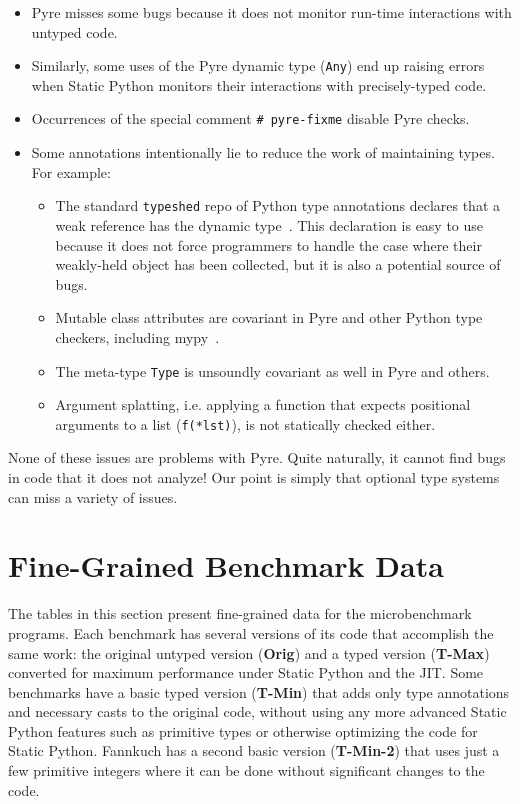 \documentclass[english,cleveref,submission]{programming}
\newcommand{\SP}{Static Python}
\newcommand{\code}[1]{\texttt{#1}}
\begin{document}
\begin{itemize}
  \item
    Pyre misses some bugs because it does not monitor run-time interactions
    with untyped code.

  \item
    Similarly, some uses of the Pyre dynamic type (\code{Any}) end up
    raising errors when \SP{} monitors their interactions with precisely-typed code.

  \item
    Occurrences of the special comment \lstinline$# pyre-fixme$ disable Pyre checks.

  \item
    Some annotations intentionally lie to reduce the work of maintaining types.
    For example:

    \begin{itemize}
      \item
        The standard \code{typeshed} repo of Python type annotations declares
        that a weak reference has the dynamic type~\cite{typeshed}.
        This declaration is easy to use because it does not force programmers
        to handle the case where their weakly-held object has been collected,
        but it is also a potential source of bugs.
      \item
        Mutable class attributes are covariant in Pyre and other
        Python type checkers, including mypy~\cite{mypy}.
      \item
        The meta-type \code{Type} is unsoundly covariant as well in Pyre
        and others.
      \item
        Argument splatting, i.e. applying a function that expects positional
        arguments to a list (\code{f(*lst)}), is not statically checked
        either.
    \end{itemize}

\end{itemize}

None of these issues are problems with Pyre.
Quite naturally, it cannot find bugs in code that it does not analyze!
Our point is simply that optional type systems can miss a variety of issues.


\section{Fine-Grained Benchmark Data}

\newcommand{\colname}[1]{\textbf{#1}}

The tables in this section present fine-grained data for the microbenchmark programs.
Each benchmark has several versions of its code that accomplish the same work:
the original untyped version (\colname{Orig}) and a typed version (\colname{T-Max}) converted for maximum
performance under Static Python and the JIT.
Some benchmarks have a basic typed version (\colname{T-Min}) that adds only
type annotations and necessary casts to the original code,
without using any more advanced Static Python
features such as primitive types or otherwise optimizing the code for Static
Python.
Fannkuch has a second basic version (\colname{T-Min-2}) that uses just a few primitive integers
where it can be done without significant changes to the code.
\end{document}
